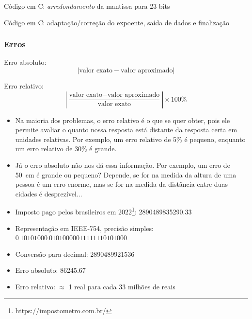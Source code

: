 \begin{frame}{Código em C: \textit{arredondamento} da mantissa para 23 bits}
    
\end{frame}

\begin{frame}{Código em C: adaptação/correção do expoente, saída de dados e finalização}
    
\end{frame}

\begin{frame}
    \frametitle{Erros}
    Erro absoluto: 
    \[
        \left| \text{valor exato} - \text{valor aproximado} \right|
    \]

    Erro relativo: 
    \[
        \left| \frac{\text{valor exato} - \text{valor aproximado}}{\text{valor exato}}  \right|\times 100\%
    \]
    \begin{block}
        {}
        \begin{itemize}
            \item Na maioria dos problemas, o erro relativo é o que se quer obter, pois ele permite avaliar o quanto nossa resposta está distante da resposta certa em unidades relativas. Por exemplo, um erro relativo de 5\% é pequeno, enquanto um erro relativo de 30\% é grande. 
            \item Já o erro absoluto não nos dá essa informação. Por exemplo, um erro de \SI{50}{cm} é grande ou pequeno? Depende, se for na medida da altura de uma pessoa é um erro enorme, mas se for na medida da distância entre duas cidades é desprezível...
        \end{itemize}
    \end{block}
\end{frame}

\begin{frame}[c]
    \begin{itemize}
        \item Imposto pago pelos brasileiros em 2022\footnote{https://impostometro.com.br/}:
            \num{2890489835290.33}
        \item Representação em IEEE-754, precisão simples: 
            \(0~1010 1000~0101 0000 0111 1111 0101 000\)
        \item Conversão para decimal: \num{2890489921536}
        \item Erro absoluto: \num{86245.67}
        \item Erro relativo: \(\approx\) 1 real para cada 33 milhões de reais
    \end{itemize}
\end{frame}

